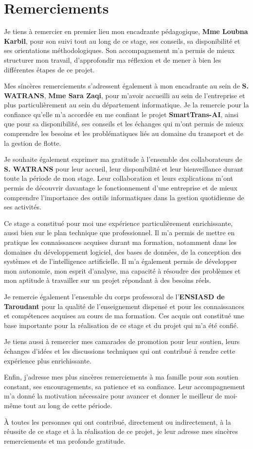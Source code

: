 \chapter*{Remerciements}

Je tiens à remercier en premier lieu mon encadrante pédagogique, \textbf{Mme Loubna Karbil}, pour son suivi tout au long de ce stage, ses conseils, sa disponibilité et ses orientations méthodologiques. Son accompagnement m'a permis de mieux structurer mon travail, d'approfondir ma réflexion et de mener à bien les différentes étapes de ce projet.

Mes sincères remerciements s'adressent également à mon encadrante au sein de \textbf{S. WATRANS}, \textbf{Mme Sara Zaqi}, pour m'avoir accueilli au sein de l'entreprise et plus particulièrement au sein du département informatique. Je la remercie pour la confiance qu'elle m'a accordée en me confiant le projet \textbf{SmartTrans-AI}, ainsi que pour sa disponibilité, ses conseils et les échanges qui m'ont permis de mieux comprendre les besoins et les problématiques liés au domaine du transport et de la gestion de flotte.

Je souhaite également exprimer ma gratitude à l'ensemble des collaborateurs de \textbf{S. WATRANS} pour leur accueil, leur disponibilité et leur bienveillance durant toute la période de mon stage. Leur collaboration et leurs explications m'ont permis de découvrir davantage le fonctionnement d'une entreprise et de mieux comprendre l'importance des outils informatiques dans la gestion quotidienne de ses activités.

Ce stage a constitué pour moi une expérience particulièrement enrichissante, aussi bien sur le plan technique que professionnel. Il m'a permis de mettre en pratique les connaissances acquises durant ma formation, notamment dans les domaines du développement logiciel, des bases de données, de la conception des systèmes et de l'intelligence artificielle. Il m'a également permis de développer mon autonomie, mon esprit d'analyse, ma capacité à résoudre des problèmes et mon aptitude à travailler sur un projet répondant à des besoins réels.

Je remercie également l'ensemble du corps professoral de l'\textbf{ENSIASD de Taroudant} pour la qualité de l'enseignement dispensé et pour les connaissances et compétences acquises au cours de ma formation. Ces acquis ont constitué une base importante pour la réalisation de ce stage et du projet qui m'a été confié.

Je tiens aussi à remercier mes camarades de promotion pour leur soutien, leurs échanges d'idées et les discussions techniques qui ont contribué à rendre cette expérience plus enrichissante.

Enfin, j'adresse mes plus sincères remerciements à ma famille pour son soutien constant, ses encouragements, sa patience et sa confiance. Leur accompagnement m'a donné la motivation nécessaire pour avancer et donner le meilleur de moi-même tout au long de cette période.

À toutes les personnes qui ont contribué, directement ou indirectement, à la réussite de ce stage et à la réalisation de ce projet, je leur adresse mes sincères remerciements et ma profonde gratitude.
